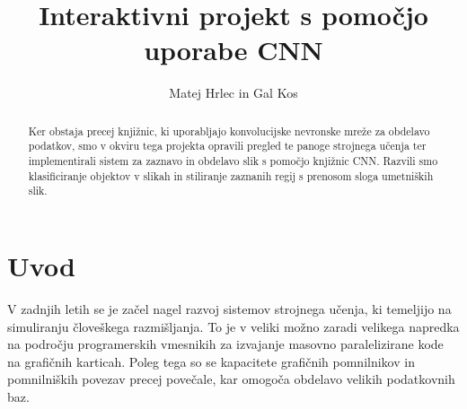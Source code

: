\documentclass[runningheads,a4paper]{llncs}
\newcommand{\keywords}[1]{\par\addvspace\baselineskip
\noindent\keywordname\enspace\ignorespaces#1}
\begin{document}
\mainmatter  %

\title{Interaktivni projekt s pomočjo uporabe CNN}


%
%
\author{%
Matej Hrlec in 
Gal Kos 
}%
%


%
%

\maketitle


\begin{abstract}
Ker obstaja precej knjižnic, ki uporabljajo konvolucijske nevronske mreže za obdelavo podatkov, smo v okviru tega projekta opravili pregled te panoge strojnega učenja ter implementirali sistem za zaznavo in obdelavo slik s pomočjo knjižnic CNN. Razvili smo klasificiranje objektov v slikah in stiliranje zaznanih regij s prenosom sloga umetniških slik.
\end{abstract}


\section{Uvod}
V zadnjih letih se je začel nagel razvoj sistemov strojnega učenja, ki temeljijo na simuliranju človeškega razmišljanja. To je v veliki možno zaradi velikega napredka na področju programerskih vmesnikih za izvajanje masovno paralelizirane kode na grafičnih karticah. Poleg tega so se kapacitete grafičnih pomnilnikov in pomnilniških povezav precej povečale, kar omogoča obdelavo velikih podatkovnih baz.
\end{document}
